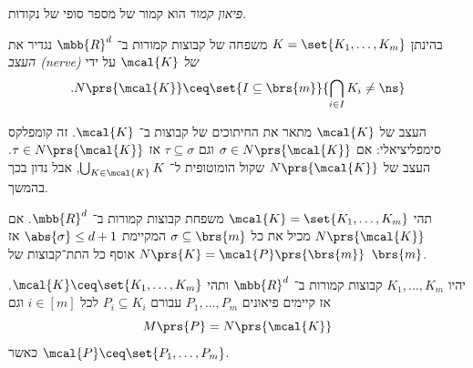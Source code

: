 \documentclass[a4paper,10pt,twoside,openany]{book}
\begin{document}
\begin{definition}
\emph{פיאון קמור}
הוא קמור של מספר סופי של נקודות.
\end{definition}

\begin{definition}[עצב]
בהינתן
$K = \set{K_1, \ldots, K_m}$
משפחה של קבוצות קמורות ב־%
$\mbb{R}^d$
נגדיר את
\emph{העצב \textenglish{(nerve)}
של
$\mcal{K}$}
על ידי
\[\text{.} N\prs{\mcal{K}} \ceq \set{I \subseteq \brs{m}}{\bigcap_{i \in I} K_i \neq \ns}\]
\end{definition}

\begin{remark}
העצב של
$\mcal{K}$
מתאר את החיתוכים של קבוצות ב־%
$\mcal{K}$.
זה קומפלקס סימפליציאלי: אם
$\sigma \in N\prs{\mcal{K}}$
וגם
$\tau \subseteq \sigma$
אז
$\tau \in N\prs{\mcal{K}}$.
העצב של
$N\prs{\mcal{K}}$
שקול הומוטופית ל־%
$\bigcup_{K \in \mcal{K}} K$,
אבל נדון בכך בהמשך.
\end{remark}

\begin{theorem}
תהי
$\mcal{K} = \set{K_1, \ldots, K_m}$
משפחת קבוצות קמורות ב־%
$\mbb{R}^d$.
אם
$N\prs{\mcal{K}}$
מכיל את כל
$\sigma \subseteq \brs{m}$
המקיימת
$\abs{\sigma} \leq d+1$
אז
$N\prs{K} = \mcal{P}\prs{\brs{m}}$
אוסף כל התת־קבוצות של
$\brs{m}$.
\end{theorem}

\begin{proposition}\label{proposition:polytopes-nerve}
יהיו
$K_1, \ldots, K_m$
קבוצות קמורות ב־%
$\mbb{R}^d$
ותהי
$\mcal{K} \ceq \set{K_1, \ldots, K_m}$.
אז קיימים פיאונים
$P_1, \ldots, P_m$
עבורם
$P_i \subseteq K_i$
לכל
$i \in [m]$
וגם
\[M\prs{P} = N\prs{\mcal{K}}\]
כאשר
$\mcal{P} \ceq \set{P_1, \ldots, P_m}$.
\end{proposition}
\end{document}
